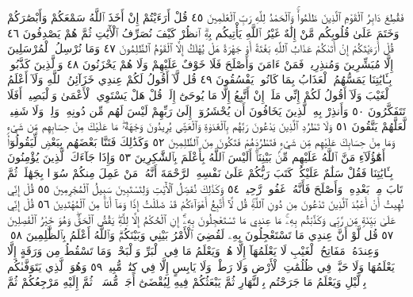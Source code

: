 فَقُطِعَ دَابِرُ ٱلْقَوْمِ ٱلَّذِينَ ظَلَمُوا۟ۚ وَٱلْحَمْدُ لِلَّهِ رَبِّ ٱلْعَٰلَمِينَ ٤٥
قُلْ أَرَءَيْتُمْ إِنْ أَخَذَ ٱللَّهُ سَمْعَكُمْ وَأَبْصَٰرَكُمْ وَخَتَمَ عَلَىٰ قُلُوبِكُم
مَّنْ إِلَٰهٌ غَيْرُ ٱللَّهِ يَأْتِيكُم بِهِۗ ٱنظُرْ كَيْفَ نُصَرِّفُ ٱلْأٓيَٰتِ
ثُمَّ هُمْ يَصْدِفُونَ ٤٦ قُلْ أَرَءَيْتَكُمْ إِنْ أَتَىٰكُمْ عَذَابُ ٱللَّهِ
بَغْتَةً أَوْ جَهْرَةً هَلْ يُهْلَكُ إِلَّا ٱلْقَوْمُ ٱلظَّٰلِمُونَ ٤٧ وَمَا
نُرْسِلُ ٱلْمُرْسَلِينَ إِلَّا مُبَشِّرِينَ وَمُنذِرِينَۖ فَمَنْ ءَامَنَ وَأَصْلَحَ
فَلَا خَوْفٌ عَلَيْهِمْ وَلَا هُمْ يَحْزَنُونَ ٤٨ وَٱلَّذِينَ كَذَّبُوا۟ بِـَٔايَٰتِنَا
يَمَسُّهُمُ ٱلْعَذَابُ بِمَا كَانُوا۟ يَفْسُقُونَ ٤٩ قُل لَّآ أَقُولُ لَكُمْ
عِندِي خَزَآئِنُ ٱللَّهِ وَلَآ أَعْلَمُ ٱلْغَيْبَ وَلَآ أَقُولُ لَكُمْ إِنِّي مَلَكٌۖ
إِنْ أَتَّبِعُ إِلَّا مَا يُوحَىٰٓ إِلَيَّۚ قُلْ هَلْ يَسْتَوِي ٱلْأَعْمَىٰ وَٱلْبَصِيرُۚ
أَفَلَا تَتَفَكَّرُونَ ٥٠ وَأَنذِرْ بِهِ ٱلَّذِينَ يَخَافُونَ أَن يُحْشَرُوٓا۟ إِلَىٰ
رَبِّهِمْ لَيْسَ لَهُم مِّن دُونِهِۦ وَلِيࣱّ وَلَا شَفِيعࣱ لَّعَلَّهُمْ يَتَّقُونَ ٥١
وَلَا تَطْرُدِ ٱلَّذِينَ يَدْعُونَ رَبَّهُم بِٱلْغَدَوٰةِ وَٱلْعَشِيِّ يُرِيدُونَ
وَجْهَهُۥۖ مَا عَلَيْكَ مِنْ حِسَابِهِم مِّن شَيْءࣲ وَمَا مِنْ حِسَابِكَ
عَلَيْهِم مِّن شَيْءࣲ فَتَطْرُدَهُمْ فَتَكُونَ مِنَ ٱلظَّٰلِمِينَ ٥٢
وَكَذَٰلِكَ فَتَنَّا بَعْضَهُم بِبَعْضࣲ لِّيَقُولُوٓا۟ أَهَٰٓؤُلَآءِ مَنَّ ٱللَّهُ
عَلَيْهِم مِّنۢ بَيْنِنَآۗ أَلَيْسَ ٱللَّهُ بِأَعْلَمَ بِٱلشَّٰكِرِينَ ٥٣ وَإِذَا
جَآءَكَ ٱلَّذِينَ يُؤْمِنُونَ بِـَٔايَٰتِنَا فَقُلْ سَلَٰمٌ عَلَيْكُمْۖ كَتَبَ
رَبُّكُمْ عَلَىٰ نَفْسِهِ ٱلرَّحْمَةَ أَنَّهُۥ مَنْ عَمِلَ مِنكُمْ سُوٓءَۢا
بِجَهَٰلَةࣲ ثُمَّ تَابَ مِنۢ بَعْدِهِۦ وَأَصْلَحَ فَأَنَّهُۥ غَفُورࣱ رَّحِيمࣱ ٥٤
وَكَذَٰلِكَ نُفَصِّلُ ٱلْأٓيَٰتِ وَلِتَسْتَبِينَ سَبِيلُ ٱلْمُجْرِمِينَ ٥٥
قُلْ إِنِّي نُهِيتُ أَنْ أَعْبُدَ ٱلَّذِينَ تَدْعُونَ مِن دُونِ ٱللَّهِۚ قُل
لَّآ أَتَّبِعُ أَهْوَآءَكُمْ قَدْ ضَلَلْتُ إِذࣰا وَمَآ أَنَا۠ مِنَ ٱلْمُهْتَدِينَ ٥٦
قُلْ إِنِّي عَلَىٰ بَيِّنَةࣲ مِّن رَّبِّي وَكَذَّبْتُم بِهِۦۚ مَا عِندِي مَا
تَسْتَعْجِلُونَ بِهِۦٓۚ إِنِ ٱلْحُكْمُ إِلَّا لِلَّهِۖ يَقُصُّ ٱلْحَقَّۖ وَهُوَ
خَيْرُ ٱلْفَٰصِلِينَ ٥٧ قُل لَّوْ أَنَّ عِندِي مَا تَسْتَعْجِلُونَ بِهِۦ لَقُضِيَ
ٱلْأَمْرُ بَيْنِي وَبَيْنَكُمْۗ وَٱللَّهُ أَعْلَمُ بِٱلظَّٰلِمِينَ ٥٨۞ وَعِندَهُۥ
مَفَاتِحُ ٱلْغَيْبِ لَا يَعْلَمُهَآ إِلَّا هُوَۚ وَيَعْلَمُ مَا فِي ٱلْبَرِّ
وَٱلْبَحْرِۚ وَمَا تَسْقُطُ مِن وَرَقَةٍ إِلَّا يَعْلَمُهَا وَلَا حَبَّةࣲ فِي ظُلُمَٰتِ
ٱلْأَرْضِ وَلَا رَطْبࣲ وَلَا يَابِسٍ إِلَّا فِي كِتَٰبࣲ مُّبِينࣲ ٥٩
وَهُوَ ٱلَّذِي يَتَوَفَّىٰكُم بِٱلَّيْلِ وَيَعْلَمُ مَا جَرَحْتُم بِٱلنَّهَارِ ثُمَّ
يَبْعَثُكُمْ فِيهِ لِيُقْضَىٰٓ أَجَلࣱ مُّسَمࣰّىۖ ثُمَّ إِلَيْهِ مَرْجِعُكُمْ ثُمَّ
